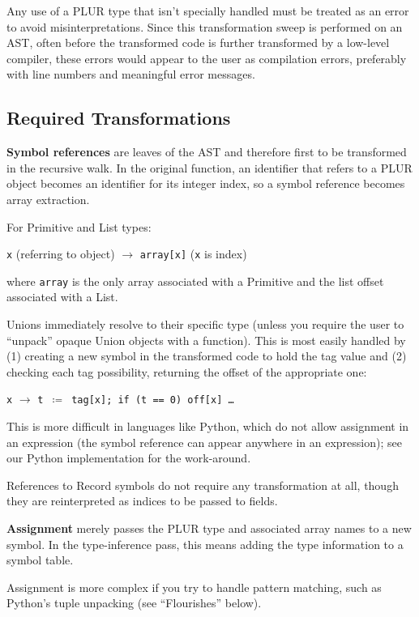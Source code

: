 \documentclass[10pt, conference, compsocconf]{IEEEtran}
\begin{document}
Any use of a PLUR type that isn't specially handled must be treated as an error to avoid misinterpretations. Since this transformation sweep is performed on an AST, often before the transformed code is further transformed by a low-level compiler, these errors would appear to the user as compilation errors, preferably with line numbers and meaningful error messages.

\subsection{Required Transformations}

{\bf Symbol references} are leaves of the AST and therefore first to be transformed in the recursive walk. In the original function, an identifier that refers to a PLUR object becomes an identifier for its integer index, so a symbol reference becomes array extraction.

For Primitive and List types:
\begin{center}
{\tt x} (referring to object) $\to$ {\tt array[x]} ({\tt x} is index)
\end{center}
where {\tt array} is the only array associated with a Primitive and the list offset associated with a List.

Unions immediately resolve to their specific type (unless you require the user to ``unpack'' opaque Union objects with a function). This is most easily handled by (1) creating a new symbol in the transformed code to hold the tag value and (2) checking each tag possibility, returning the offset of the appropriate one:
\begin{center}
{\tt x} $\to$ {\tt t $\coloneqq$ tag[x]; if (t == 0) off[x] \ldots}
\end{center}
This is more difficult in languages like Python, which do not allow assignment in an expression (the symbol reference can appear anywhere in an expression); see our Python implementation\cite{plur} for the work-around.

References to Record symbols do not require any transformation at all, though they are reinterpreted as indices to be passed to fields.

{\bf Assignment} merely passes the PLUR type and associated array names to a new symbol. In the type-inference pass, this means adding the type information to a symbol table.

Assignment is more complex if you try to handle pattern matching, such as Python's tuple unpacking (see ``Flourishes'' below).
\end{document}
